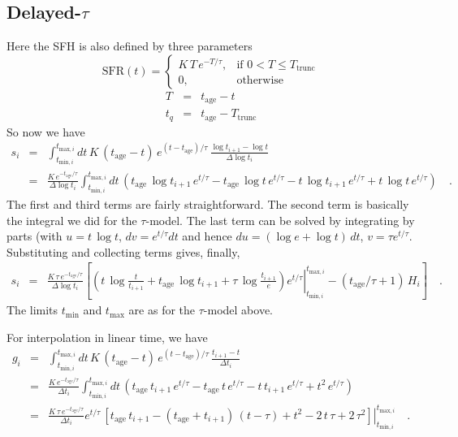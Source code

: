 \documentclass[12pt, letterpaper, preprint]{aastex}
\newcommand{\tmin}[1][]{t_{\mathrm{min} #1}}
\newcommand{\tmax}[1][]{t_{\mathrm{max} #1}}
\newcommand{\dlt}{\Delta\log t_i}
\newcommand{\dt}{\Delta t_i}
\newcommand{\tintegral}{\int_{\tmin[,i]}^{\tmax[,i]} dt}
\newcommand{\tinterval}{\right|_{\tmin[,i]}^{\tmax[,i]}}
\newcommand{\sftrunc}{T_{\mathrm{trunc}}}
\newcommand{\tage}{t_{\mathrm{age}}}
\begin{document}
\subsection{Delayed-$\tau$}
Here the SFH is also defined by three parameters
\[ 
\mathrm{SFR}(t) = 
\begin{cases}
K \, T \, e^{-T/\tau}, &  \text{if } 0 < T \leq \sftrunc\\
0, & \text{otherwise}
\end{cases}
\]
\begin{eqnarray}
T & = & \tage - t \nonumber \\
t_q & = & \tage - \sftrunc\nonumber
\end{eqnarray}
So now we have
\begin{eqnarray}
s_i  & = & \tintegral \, K \, (\tage-t) \, e^{(t-\tage) /\tau}\, \frac{\log t_{i+1} - \log t}{\dlt}  \nonumber \\
      & = & \frac{K \, e^{-\tage/\tau}}{\dlt} \tintegral \, \left(\tage \, \log t_{i+1} \, e^{t/\tau}  - \tage \, \log t \, e^{t/\tau} - t \, \log t_{i+1} \, e^{t/\tau} + t \, \log t \, e^{t/\tau}\right) \quad .\nonumber
\end{eqnarray}
The first and third terms are fairly straightforward.  The second term is basically the integral we did for the $\tau$-model.  The last term can be solved by integrating by parts (with $u=t\,\log t$, $dv=e^{t/\tau}dt$ and hence $du=(\log e + \log t)\, dt$, $v=\tau e^{t/\tau}$.  Substituting and collecting terms gives, finally, 
\begin{eqnarray}
s_i  & = & \frac{K \, \tau \,  e^{-\tage/\tau}}{\dlt} \left[\left.\left(t\,\log \frac{t}{t_{i+1}} + \tage\,\log t_{i+1}  + \tau\,\log \frac{t_{i+1}}{e}\right) e^{t/\tau}\tinterval - (\tage/\tau+1)\, H_i\right] \quad .
\end{eqnarray}
The limits $\tmin$ and $\tmax$ are as for the $\tau$-model above.

For interpolation in linear time, we have
\begin{eqnarray}
g_i  & = & \tintegral \, K \, (\tage-t) \, e^{(t-\tage) /\tau}\, \frac{t_{i+1} - t}{\dt}  \nonumber \\
      & = & \frac{K \, e^{-\tage/\tau}}{\dt} \tintegral \, \left(\tage \, t_{i+1} \, e^{t/\tau}  - \tage \, t \, e^{t/\tau} - t \,  t_{i+1} \, e^{t/\tau} + t^2 \, e^{t/\tau}\right) \nonumber \\
     & = & \frac{K \, \tau \, e^{-\tage/\tau}}{\dt} \left. e^{t/\tau} \, \left[ \tage \, t_{i+1} - (\tage + t_{i+1})\, (t-\tau) + t^2 - 2\, t\, \tau + 2\, \tau^2\right] \tinterval \quad .
\end{eqnarray}
\end{document}
